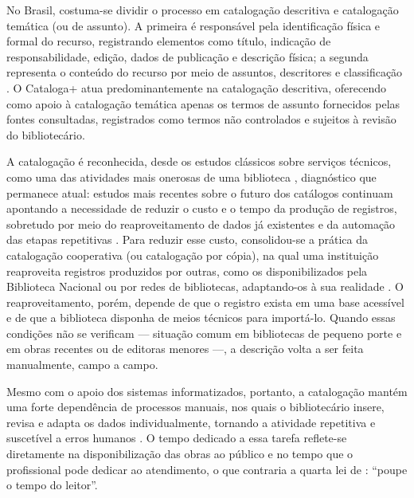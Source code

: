 No Brasil, costuma-se dividir o processo em catalogação descritiva e catalogação temática (ou de assunto). A primeira é responsável pela identificação física e formal do recurso, registrando elementos como título, indicação de responsabilidade, edição, dados de publicação e descrição física; a segunda representa o conteúdo do recurso por meio de assuntos, descritores e classificação \cite{mey2009}. O Cataloga+ atua predominantemente na catalogação descritiva, oferecendo como apoio à catalogação temática apenas os termos de assunto fornecidos pelas fontes consultadas, registrados como termos não controlados e sujeitos à revisão do bibliotecário.

A catalogação é reconhecida, desde os estudos clássicos sobre serviços técnicos, como uma das atividades mais onerosas de uma biblioteca \cite{tauber1954}, diagnóstico que permanece atual: estudos mais recentes sobre o futuro dos catálogos continuam apontando a necessidade de reduzir o custo e o tempo da produção de registros, sobretudo por meio do reaproveitamento de dados já existentes e da automação das etapas repetitivas \cite{calhoun2006,joudrey2018}.
Para reduzir esse custo, consolidou-se a prática da catalogação cooperativa (ou catalogação por cópia), na qual uma instituição reaproveita registros produzidos por outras, como os disponibilizados pela Biblioteca Nacional ou por redes de bibliotecas, adaptando-os à sua realidade \cite{mey2009}. O reaproveitamento, porém, depende de que o registro exista em uma base acessível e de que a biblioteca disponha de meios técnicos para importá-lo. Quando essas condições não se verificam --- situação comum em bibliotecas de pequeno porte e em obras recentes ou de editoras menores ---, a descrição volta a ser feita manualmente, campo a campo.

Mesmo com o apoio dos sistemas informatizados, portanto, a catalogação mantém uma forte dependência de processos manuais, nos quais o bibliotecário insere, revisa e adapta os dados individualmente, tornando a atividade repetitiva e suscetível a erros humanos \cite{mey2009}. O tempo dedicado a essa tarefa reflete-se diretamente na disponibilização das obras ao público e no tempo que o profissional pode dedicar ao atendimento, o que contraria a quarta lei de : ``poupe o tempo do leitor''.

